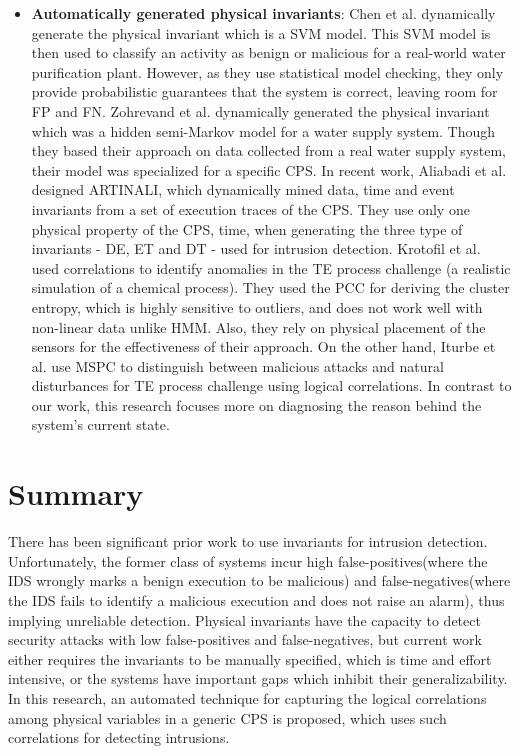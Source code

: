 \begin{itemize}
\item \textbf{Automatically generated physical invariants}: Chen et al. \cite{chen2018learning} dynamically generate the physical invariant which is a \ac{SVM} model. This \ac{SVM} model is then used to classify an activity as benign or malicious for a real-world water purification plant. However, as they use statistical model checking, they only provide probabilistic guarantees that the system is correct, leaving room for \acf{FP} and \acf{FN}. Zohrevand et al. \cite{zohrevand2016hidden} dynamically generated the physical invariant which was a hidden semi-Markov model for a water supply system. Though they based their approach on  data collected from a real water supply system, their model was specialized for a specific \ac{CPS}. In recent work, Aliabadi et al. \cite{aliabadi2017artinali} designed ARTINALI, which dynamically mined data, time and event invariants from a set of execution traces of the \ac{CPS}. They use only one physical property of the \ac{CPS}, time, when generating the three type of invariants - D\textbar E, E\textbar T and D\textbar T - used for intrusion detection. Krotofil et al. \cite{krotofil2015process} used correlations to identify anomalies in the \ac{TE} process challenge (a realistic simulation of a chemical process). They used the \acf{PCC} for deriving the cluster entropy, which is highly sensitive to outliers, and does not work well with non-linear data unlike \ac{HMM}. Also, they rely on physical placement of the sensors for the effectiveness of their approach. On the other hand, Iturbe et al. \cite{iturbe2017feasibility} use \ac{MSPC} to distinguish between malicious attacks and natural disturbances for \ac{TE} process challenge using logical correlations. In contrast to our work, this research focuses more on diagnosing the reason behind the system's current state. 
\end{itemize}

\section{Summary}
There has been significant prior work to use invariants for intrusion detection. Unfortunately, the former class of systems incur high false-positives(where the IDS wrongly marks a benign execution to be malicious) and false-negatives(where the IDS fails to identify a malicious execution and does not raise an alarm), thus implying unreliable detection. Physical invariants have the capacity to detect security attacks with low false-positives and false-negatives, but current work either requires the invariants to be manually specified, which is time and effort intensive, or the systems have important gaps which inhibit their generalizability. In this research, an automated technique for capturing the logical correlations among physical variables in a generic \ac{CPS} is proposed, which uses such correlations for detecting intrusions.

\endinput
